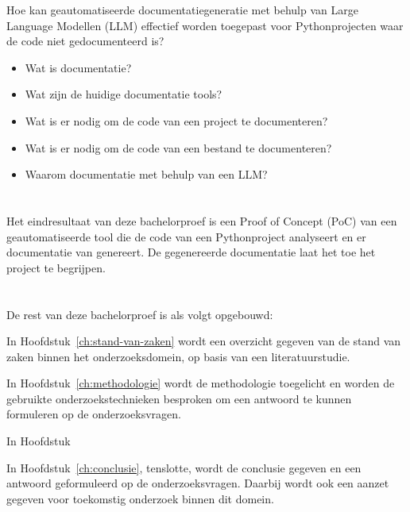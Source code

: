 Hoe kan geautomatiseerde documentatiegeneratie met behulp van Large Language Modellen (LLM) effectief worden toegepast voor Pythonprojecten waar de code niet gedocumenteerd is?

\begin{itemize}
  \item Wat is documentatie?
  \item Wat zijn de huidige documentatie tools?
  \item Wat is er nodig om de code van een project te documenteren?
  \item Wat is er nodig om de code van een bestand te documenteren?
  \item Waarom documentatie met behulp van een LLM?
\end{itemize}

\section{}%
\label{sec:onderzoeksdoelstelling}

Het eindresultaat van deze bachelorproef is een Proof of Concept (PoC) van een geautomatiseerde tool die de code van een Pythonproject analyseert en er documentatie van genereert.
De gegenereerde documentatie laat het toe het project te begrijpen.

\section{}%
\label{sec:opzet-bachelorproef}


De rest van deze bachelorproef is als volgt opgebouwd:

In Hoofdstuk~\ref{ch:stand-van-zaken} wordt een overzicht gegeven van de stand van zaken binnen het onderzoeksdomein, op basis van een literatuurstudie.

In Hoofdstuk~\ref{ch:methodologie} wordt de methodologie toegelicht en worden de gebruikte onderzoekstechnieken besproken om een antwoord te kunnen formuleren op de onderzoeksvragen.


In Hoofdstuk

In Hoofdstuk~\ref{ch:conclusie}, tenslotte, wordt de conclusie gegeven en een antwoord geformuleerd op de onderzoeksvragen. Daarbij wordt ook een aanzet gegeven voor toekomstig onderzoek binnen dit domein.